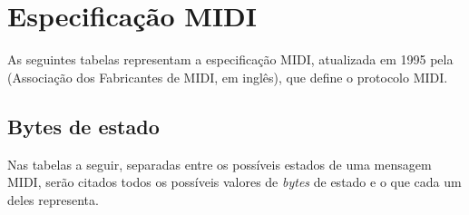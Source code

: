 \chapter{Especificação MIDI}

    As seguintes tabelas representam a especificação MIDI, atualizada em 1995 pela  (Associação dos Fabricantes de MIDI, em inglês), que define o protocolo MIDI.
    
    \section{Bytes de estado}
    
        Nas tabelas a seguir, separadas entre os possíveis estados de uma mensagem MIDI, serão citados todos os possíveis valores de \textit{bytes} de estado e o que cada um deles representa.
        
        
